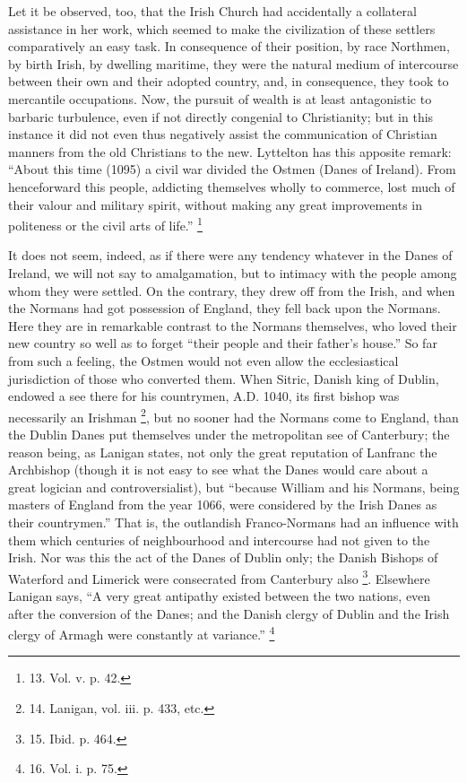 Let it be observed, too, that
the Irish Church had accidentally a collateral assistance in her work,
which seemed to make the civilization of these settlers comparatively
an easy task. In consequence of their position, by race Northmen, by
birth Irish, by dwelling maritime, they were the natural medium of
intercourse between their own and their adopted country, and, in
consequence, they took to mercantile occupations. Now, the
pursuit of wealth is at least antagonistic to barbaric turbulence,
even if not directly congenial to Christianity; but in this instance
it did not even thus negatively assist the communication of Christian
manners from the old Christians to the new. Lyttelton has this
apposite remark: ``About this time (1095) a civil war divided the
Ostmen (Danes of Ireland). From henceforward this people, addicting
themselves wholly to commerce, lost much of their valour and military
spirit, without making any great improvements in politeness or the
civil arts of life.'' \footnote{13.
Vol. v. p. 42.}

It does not seem, indeed, as
if there were any tendency whatever in the Danes of Ireland, we will
not say to amalgamation, but to intimacy with the people among whom
they were settled. On the contrary, they drew off from the Irish, and
when the Normans had got possession of England, they fell back upon
the Normans. Here they are in remarkable contrast to the Normans
themselves, who loved their new country so well as to forget ``their
people and their father's house.'' So far from such a feeling, the
Ostmen would not even allow the ecclesiastical jurisdiction of those
who converted them. When Sitric, Danish king of Dublin, endowed a see
there for his countrymen, A.D. 1040, its first bishop was necessarily an
Irishman \footnote{14.
Lanigan, vol. iii. p. 433, etc.}, but no
sooner had the Normans come to England, than the Dublin Danes put
themselves under the metropolitan see of Canterbury; the reason being,
as Lanigan states, not only the great reputation of Lanfranc the
Archbishop (though it is not easy to see what the Danes would care
about a great logician and controversialist), but ``because William and
his Normans, being masters of England from the year 1066, were
considered by the Irish Danes as their countrymen.'' That is, the
outlandish Franco-Normans had an influence with them which
centuries of neighbourhood and intercourse had not given to the Irish.
Nor was this the act of the Danes of Dublin only; the Danish Bishops
of Waterford and Limerick were consecrated from Canterbury also \footnote{15.
Ibid. p. 464.}. Elsewhere Lanigan says, ``A very great antipathy existed
between the two nations, even after the conversion of the Danes; and
the Danish clergy of Dublin and the Irish clergy of Armagh were
constantly at variance.'' \footnote{16.
Vol. i. p. 75.}

